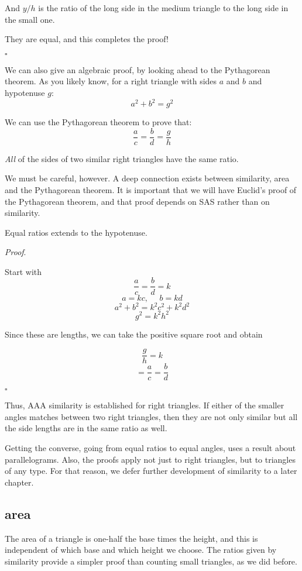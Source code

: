 \documentclass[11pt, oneside]{article}
\begin{document}
And $y/h$ is the ratio of the long side in the medium triangle to the long side in the small one.

They are equal, and this completes the proof!

$\square$

We can also give an algebraic proof, by looking ahead to the Pythagorean theorem.  As you likely know, for a right triangle with sides $a$ and $b$ and hypotenuse $g$:
\[ a^2 + b^2 = g^2 \]

We can use the Pythagorean theorem to prove that:
\[ \frac{a}{c} = \frac{b}{d} = \frac{g}{h} \]

\emph{All} of the sides of two similar right triangles have the same ratio.  

We must be careful, however.  A deep connection exists between similarity, area and the Pythagorean theorem.  It is important that we will have Euclid's proof of the Pythagorean theorem, and that proof depends on SAS rather than on similarity.

Equal ratios extends to the hypotenuse.

\emph{Proof}.

Start with 
\[ \frac{a}{c} = \frac{b}{d} = k \]
\[ a = kc, \ \ \ \ \ \ b = kd \]
\[ a^2 + b^2 = k^2c^2 + k^2d^2 \]
\[ g^2 = k^2h^2 \]

Since these are lengths, we can take the positive square root and obtain

\[ \frac{g}{h} = k \]
\[ = \frac{a}{c} = \frac{b}{d} \]

$\square$

Thus, AAA similarity is established for right triangles.  If either of the smaller angles matches between two right triangles, then they are not only similar but all the side lengths are in the same ratio as well.

Getting the converse, going from equal ratios to equal angles, uses a result about parallelograms.  Also, the proofs apply not just to right triangles, but to triangles of any type.  For that reason, we defer further development of similarity to a later chapter.

\subsection*{area}
The area of a triangle is one-half the base times the height, and this is independent of which base and which height we choose.  The ratios given by similarity provide a simpler proof than counting small triangles, as we did before.
\end{document}
